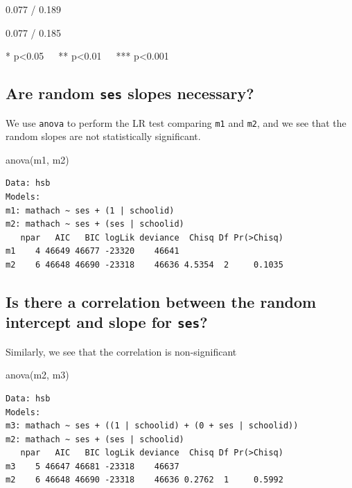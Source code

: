 \documentclass[
  letterpaper,
  DIV=11,
  numbers=noendperiod]{scrreprt}
\newenvironment{Shaded}{\begin{snugshade}}{\end{snugshade}}
\newcommand{\FunctionTok}[1]{\textcolor[rgb]{0.02,0.16,0.49}{#1}}
\newcommand{\NormalTok}[1]{\textcolor[rgb]{0.00,0.44,0.13}{#1}}
\begin{document}
0.077 / 0.189

0.077 / 0.185

* p\textless0.05~~~** p\textless0.01~~~*** p\textless0.001

\hypertarget{are-random-ses-slopes-necessary}{%
\subsection{\texorpdfstring{Are random \texttt{ses} slopes
necessary?}{Are random ses slopes necessary?}}\label{are-random-ses-slopes-necessary}}

We use \texttt{anova} to perform the LR test comparing \texttt{m1} and
\texttt{m2}, and we see that the random slopes are not statistically
significant.

\begin{Shaded}
\begin{Highlighting}[]
\FunctionTok{anova}\NormalTok{(m1, m2)}
\end{Highlighting}
\end{Shaded}

\begin{verbatim}
Data: hsb
Models:
m1: mathach ~ ses + (1 | schoolid)
m2: mathach ~ ses + (ses | schoolid)
   npar   AIC   BIC logLik deviance  Chisq Df Pr(>Chisq)
m1    4 46649 46677 -23320    46641                     
m2    6 46648 46690 -23318    46636 4.5354  2     0.1035
\end{verbatim}

\hypertarget{is-there-a-correlation-between-the-random-intercept-and-slope-for-ses}{%
\subsection{\texorpdfstring{Is there a correlation between the random
intercept and slope for
\texttt{ses}?}{Is there a correlation between the random intercept and slope for ses?}}\label{is-there-a-correlation-between-the-random-intercept-and-slope-for-ses}}

Similarly, we see that the correlation is non-significant

\begin{Shaded}
\begin{Highlighting}[]
\FunctionTok{anova}\NormalTok{(m2, m3)}
\end{Highlighting}
\end{Shaded}

\begin{verbatim}
Data: hsb
Models:
m3: mathach ~ ses + ((1 | schoolid) + (0 + ses | schoolid))
m2: mathach ~ ses + (ses | schoolid)
   npar   AIC   BIC logLik deviance  Chisq Df Pr(>Chisq)
m3    5 46647 46681 -23318    46637                     
m2    6 46648 46690 -23318    46636 0.2762  1     0.5992
\end{verbatim}
\end{document}

